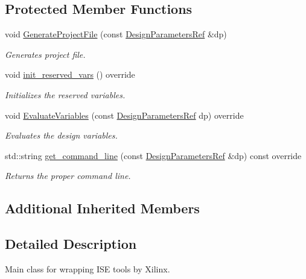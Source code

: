 \subsection*{Protected Member Functions}
\begin{DoxyCompactItemize}
\item 
void \hyperlink{classxst__wrapper_a4f64eada1880d6a4e235de5c5e6dc299}{Generate\+Project\+File} (const \hyperlink{DesignParameters_8hpp_ae36bb1c4c9150d0eeecfe1f96f42d157}{Design\+Parameters\+Ref} \&dp)
\begin{DoxyCompactList}\small\item\em Generates project file. \end{DoxyCompactList}\item 
void \hyperlink{classxst__wrapper_a31f5b1a54ab117aaf0c0657854801fa4}{init\+\_\+reserved\+\_\+vars} () override
\begin{DoxyCompactList}\small\item\em Initializes the reserved variables. \end{DoxyCompactList}\item 
void \hyperlink{classxst__wrapper_a435ee7658a8245fbee5a7b2f872d0947}{Evaluate\+Variables} (const \hyperlink{DesignParameters_8hpp_ae36bb1c4c9150d0eeecfe1f96f42d157}{Design\+Parameters\+Ref} dp) override
\begin{DoxyCompactList}\small\item\em Evaluates the design variables. \end{DoxyCompactList}\item 
std\+::string \hyperlink{classxst__wrapper_a855756749f4d6ba8b04072b3f9439c10}{get\+\_\+command\+\_\+line} (const \hyperlink{DesignParameters_8hpp_ae36bb1c4c9150d0eeecfe1f96f42d157}{Design\+Parameters\+Ref} \&dp) const override
\begin{DoxyCompactList}\small\item\em Returns the proper command line. \end{DoxyCompactList}\end{DoxyCompactItemize}
\subsection*{Additional Inherited Members}


\subsection{Detailed Description}
Main class for wrapping I\+SE tools by Xilinx. 

